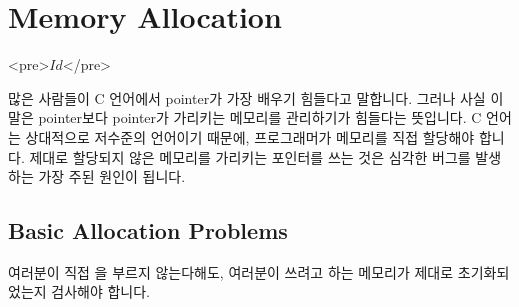 \chapter{Memory Allocation}	\label{chap:memalloc}

\begin{rawhtml}
<pre>$Id$</pre>
\end{rawhtml}

많은 사람들이 C 언어에서 pointer가 가장 배우기 힘들다고 말합니다.
그러나 사실 이 말은 pointer보다 pointer가 가리키는 메모리를 관리하기가
힘들다는 뜻입니다. C 언어는 상대적으로 저수준의 언어이기 때문에,
프로그래머가 메모리를 직접 할당해야 합니다.
제대로 할당되지 않은 메모리를 가리키는 포인터를 쓰는 것은 심각한 버그를
발생하는 가장 주된 원인이 됩니다.

\section{Basic Allocation Problems}
여러분이 직접 을 부르지 않는다해도, 여러분이 쓰려고 하는 메모리가
제대로 초기화되었는지 검사해야 합니다.

